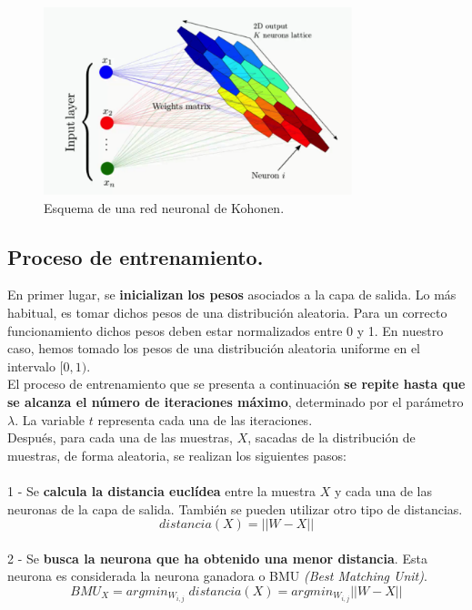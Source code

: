 \begin{figure}
\centering
\includegraphics[width=0.8\textwidth]{imagenes/arquitectura_som.png}
\caption{Esquema de una red neuronal de Kohonen.}
\end{figure}

\subsection{Proceso de entrenamiento.}

En primer lugar, se \textbf{inicializan} \textbf{los pesos} asociados a la capa de salida. Lo más habitual, es tomar dichos pesos de una distribución aleatoria.
Para un correcto funcionamiento dichos pesos deben estar normalizados entre 0 y 1. En nuestro caso, hemos tomado los pesos de una distribución aleatoria uniforme en el intervalo $[0, 1)$.\\

El proceso de entrenamiento que se presenta a continuación \textbf{se repite hasta que se alcanza el número de iteraciones máximo}, determinado por el parámetro $\lambda$. La variable $t$ representa cada una de las iteraciones.\\

Después, para cada una de las muestras, $X$, sacadas de la distribución de muestras, de forma aleatoria, se realizan los siguientes pasos: \\\\
1 - Se \textbf{calcula la distancia euclídea} entre la muestra $X$ y cada una de las neuronas de la capa de salida. También se pueden utilizar otro tipo de distancias.\\
$$distancia(X) = || W - X ||$$\\
2 - Se \textbf{busca la neurona que ha obtenido una menor distancia}. Esta neurona es considerada la neurona ganadora o BMU \textit{(Best Matching Unit)}.\\
$$BMU_X = argmin_{W_{i, j}} \; distancia(X) = argmin_{W_{i, j}} || W - X ||$$\\

